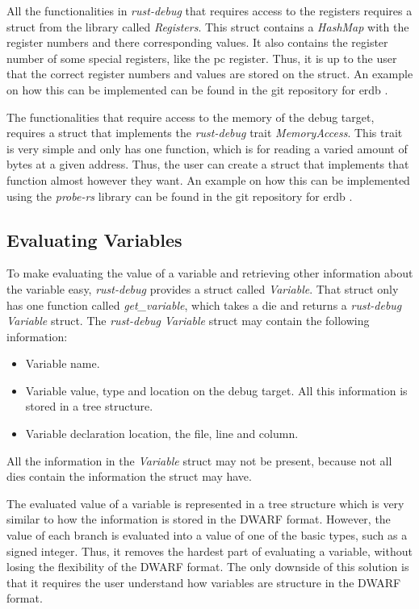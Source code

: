 All the functionalities in \emph{rust-debug} that requires access to the registers requires a struct from the library called \emph{Registers}.
This struct contains a \emph{HashMap} with the register numbers and there corresponding values.
It also contains the register number of some special registers, like the \acrshort{pc} register.
Thus, it is up to the user that the correct register numbers and values are stored on the struct.  
An example on how this can be implemented can be found in the git repository for \gls{erdb} \cite{erdb}.


The functionalities that require access to the memory of the debug target, requires a struct that implements the \emph{rust-debug} trait \emph{MemoryAccess}.
This trait is very simple and only has one function, which is for reading a varied amount of bytes at a given address.
Thus, the user can create a struct that implements that function almost however they want.
An example on how this can be implemented using the \emph{probe-rs} library can be found in the git repository for \gls{erdb} \cite{erdb}.



\subsection{Evaluating Variables} \label{sec:ievalvar}
To make evaluating the value of a variable and retrieving other information about the variable easy, \emph{rust-debug} provides a struct called \emph{Variable}.
That struct only has one function called \emph{get\_variable}, which takes a \gls{die} and returns a \emph{rust-debug} \emph{Variable} struct.
The \emph{rust-debug} \emph{Variable} struct may contain the following information:


\begin{itemize}
  \item Variable name.
  \item Variable value, type and location on the debug target. All this information is stored in a tree structure.
  \item Variable declaration location, the file, line and column.
\end{itemize}


All the information in the \emph{Variable} struct may not be present, because not all \glspl{die} contain the information the struct may have.


The evaluated value of a variable is represented in a tree structure which is very similar to how the information is stored in the \gls{DWARF} format.
However, the value of each branch is evaluated into a value of one of the basic types, such as a signed integer.
Thus, it removes the hardest part of evaluating a variable, without losing the flexibility of the \gls{DWARF} format.
The only downside of this solution is that it requires the user understand how variables are structure in the \gls{DWARF} format.


